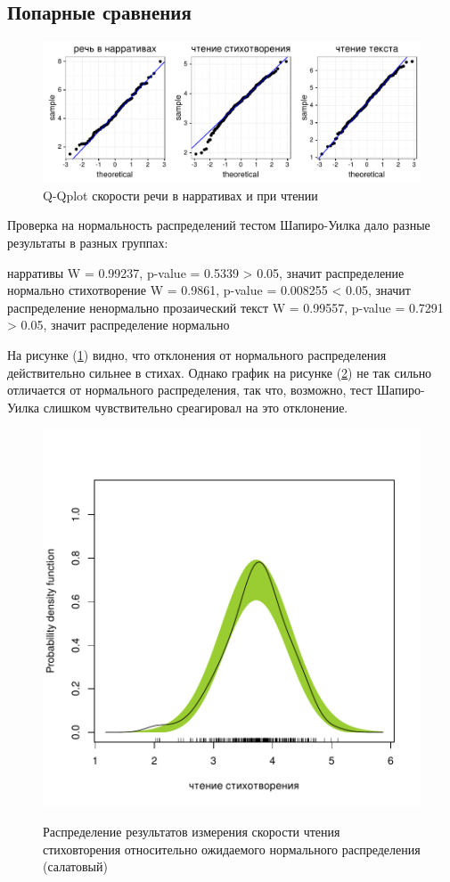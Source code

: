 \subsection{Попарные сравнения}
\begin{figure}[t!]
        \includegraphics[width=\linewidth]{qqplots.pdf}
\caption{Q-Qplot скорости речи в нарративах и при чтении}
        \label{qqplots}
\end{figure}
\noindent Проверка на нормальность распределений тестом Шапиро-Уилка дало разные результаты в разных группах:
\begin{itemize}
\mytem нарративы \hfill W = 0.99237, p-value = 0.5339 \hfill > 0.05, значит распределение нормально 
\mytem стихотворение  \hfill W = 0.9861, p-value = 0.008255 \hfill < 0.05, значит распределение ненормально 
\mytem прозаический текст \hfill W = 0.99557, p-value = 0.7291 \hfill > 0.05, значит распределение нормально 
\end{itemize}
\par На рисунке (\ref{qqplots}) видно, что отклонения от нормального распределения действительно сильнее в стихах. Однако график на рисунке (\ref{versedensity}) не так сильно отличается от нормального распределения, так что, возможно, тест Шапиро-Уилка слишком чувствительно среагировал на это отклонение.
\begin{figure}[b!]
\caption{Распределение результатов измерения скорости чтения стиховторения относительно ожидаемого нормального распределения (салатовый)}
\centering
        \includegraphics[width=0.6\linewidth]{versedensity.pdf}
        \label{versedensity}
\end{figure}
